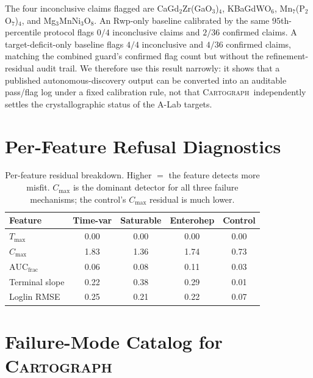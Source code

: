 \documentclass{article}
\newcommand{\method}{\textsc{Cartograph}}
\theoremstyle{plain}
\theoremstyle{definition}
\theoremstyle{remark}
\begin{document}
The four inconclusive claims flagged are CaGd$_2$Zr(GaO$_3$)$_4$,
KBaGdWO$_6$, Mn$_7$(P$_2$O$_7$)$_4$, and Mg$_3$MnNi$_3$O$_8$. An Rwp-only
baseline calibrated by the same $95$th-percentile protocol flags $0/4$
inconclusive claims and $2/36$ confirmed claims. A target-deficit-only
baseline flags $4/4$ inconclusive and $4/36$ confirmed claims, matching the
combined guard's confirmed flag count but without the refinement-residual
audit trail. We therefore use this result narrowly: it shows that a published
autonomous-discovery output can be converted into an auditable pass/flag
log under a fixed calibration rule, not that \method\ independently
settles the crystallographic status of the A-Lab targets.

\section{Per-Feature Refusal Diagnostics}
\label{app:refuse-features}

\begin{table}[h]
\caption{Per-feature residual breakdown. Higher $=$ the feature detects
more misfit. $C_{\max}$ is the dominant detector for all three failure
mechanisms; the control's $C_{\max}$ residual is much lower.}
\centering
\small
\begin{tabular}{l c c c c}
\toprule
Feature        & Time-var & Saturable & Enterohep & Control \\
\midrule
$T_{\max}$        & 0.00 & 0.00 & 0.00 & 0.00 \\
$C_{\max}$        & 1.83 & 1.36 & 1.74 & 0.73 \\
$\mathrm{AUC}_{\mathrm{frac}}$ & 0.06 & 0.08 & 0.11 & 0.03 \\
Terminal slope & 0.22 & 0.38 & 0.29 & 0.01 \\
Loglin RMSE    & 0.25 & 0.21 & 0.22 & 0.07 \\
\bottomrule
\end{tabular}
\end{table}



\section{Failure-Mode Catalog for \method}
\label{app:failure-modes}
\end{document}
